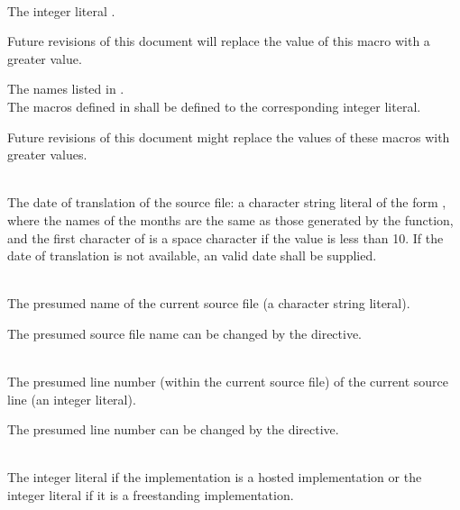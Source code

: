 \begin{description}

\item
{}%
\\
The integer literal \tcode{\cppver}.
\begin{note}
Future revisions of this document will
replace the value of this macro with a greater value.
\end{note}

\item The names listed in .\\
The macros defined in  shall be defined to
the corresponding integer literal.
\begin{note}
Future revisions of this document might replace
the values of these macros with greater values.
\end{note}

\item
{}%
\\
The date of translation of the source file:
a character string literal of the form
,
where the names of the months are the same as those generated
by the
function,
and the first character of
is a space character if the value is less than 10.
If the date of translation is not available,
an  valid date
shall be supplied.

\item
{}%
\\
The presumed name of the current source file (a character string
literal).
\begin{footnote}
The presumed source file name can be changed by the  directive.
\end{footnote}

\item
{}%
\\
The presumed line number (within the current source file) of the current source line
(an integer literal).
\begin{footnote}
The presumed line number can be changed by the  directive.
\end{footnote}

\item
{}%
%
%
\\
The integer literal 
if the implementation is a hosted implementation or
the integer literal 
if it is a freestanding implementation.


\end{description}
